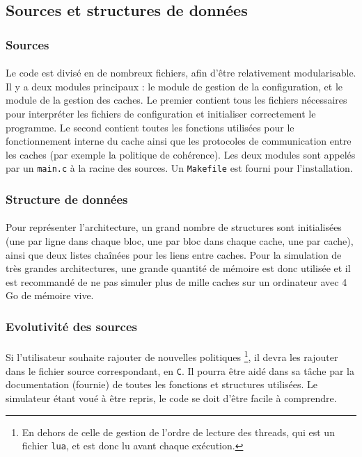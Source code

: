 \subsection{Sources et structures de données}

\subsubsection{Sources}
\paragraph{}
Le code est divisé en de nombreux fichiers, afin d'être relativement modularisable. Il y a deux modules principaux : le module de gestion de la configuration, et le module de la gestion des caches. Le premier contient tous les fichiers nécessaires pour interpréter les fichiers de configuration et initialiser correctement le programme. Le second contient toutes les fonctions utilisées pour le fonctionnement interne du cache ainsi que les protocoles de communication entre les caches (par exemple la politique de cohérence). Les deux modules sont appelés par un \verb!main.c! à la racine des sources. Un \verb!Makefile! est fourni pour l'installation.

\subsubsection{Structure de données}
\paragraph{}
Pour représenter l'architecture, un grand nombre de structures sont initialisées (une par ligne dans chaque bloc, une par bloc dans chaque cache, une par cache), ainsi que deux listes chaînées pour les liens entre caches. Pour la simulation de très grandes architectures, une grande quantité de mémoire est donc utilisée et il est recommandé de ne pas simuler plus de mille caches sur un ordinateur avec 4 Go de mémoire vive.

\subsubsection{Evolutivité des sources}
\paragraph{}
Si l'utilisateur souhaite rajouter de nouvelles politiques \footnote{En dehors de celle de gestion de l'ordre de lecture des threads, qui est un fichier \texttt{lua}, et est donc lu avant chaque exécution.}, il devra les rajouter dans le fichier source correspondant, en \texttt{C}. Il pourra être aidé dans sa tâche par la documentation (fournie) de toutes les fonctions et structures utilisées.
 Le simulateur étant voué à être repris, le code se doit d'être facile à comprendre.
